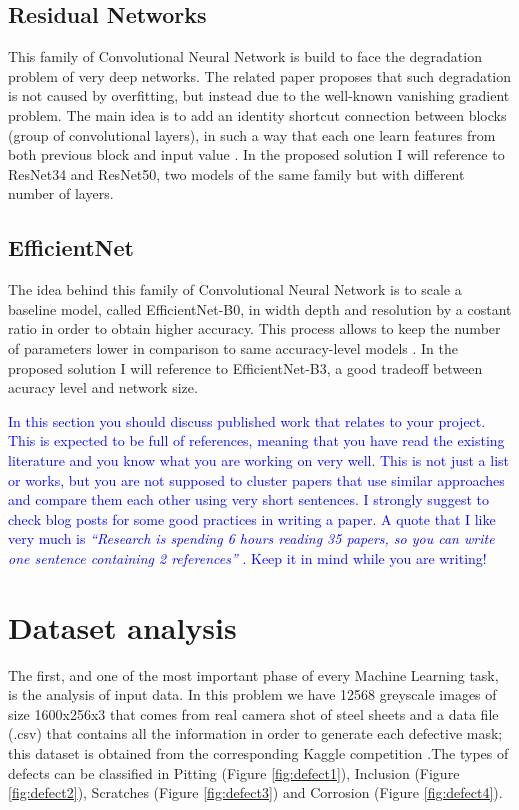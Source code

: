 \documentclass[10pt,twocolumn,letterpaper]{article}
\begin{document}
   \subsection{Residual Networks} 
      This family of Convolutional Neural Network is build to face the degradation problem of very deep networks. The related paper proposes that such degradation is not caused by overfitting, but instead due to the well-known vanishing gradient problem. The main idea is to add an identity shortcut connection between blocks (group of convolutional layers), in such a way that each one learn features from both previous block and input value \cite{resnet}.
      In the proposed solution I will reference to ResNet34 and ResNet50, two models of the same family but with different number of layers.
   \subsection{EfficientNet}
      The idea behind this family of Convolutional Neural Network is to scale a baseline model, called EfficientNet-B0, in width depth and resolution by a costant ratio in order to obtain higher accuracy. This process allows to keep the number of parameters lower in comparison to same accuracy-level models \cite{efficientnet}. In the proposed solution I will reference to EfficientNet-B3, a good tradeoff between acuracy level and network size.

\textcolor{blue}{
In this section you should discuss published work that relates to your project. This is expected to be full of references, meaning that you have read the existing literature and you know what you are working on very well. This is not just a list or works, but you are not supposed to cluster papers that use similar approaches and compare them each other using very short sentences. I strongly suggest to check \cite{steinhardt, lipton} blog posts for some good practices in writing a paper. A quote that I like very much is \emph{``Research is spending 6 hours reading 35 papers, so you can write one sentence containing 2 references''} \cite{twit:ref}. Keep it in mind while you are writing!
}



\graphicspath{ {./Resources/} }
\section{Dataset analysis}
   The first, and one of the most important phase of every Machine Learning task, is the analysis of input data. In this problem we have 12568 greyscale images of size 1600x256x3 that comes from real camera shot of steel sheets and a data file (.csv) that contains all the information in order to generate each defective mask; this dataset is obtained from the corresponding Kaggle competition \cite{Severstal}.The types of defects can be classified in Pitting (Figure \ref{fig:defect1}), Inclusion (Figure \ref{fig:defect2}), Scratches (Figure \ref{fig:defect3}) and Corrosion (Figure \ref{fig:defect4}).
\end{document}

